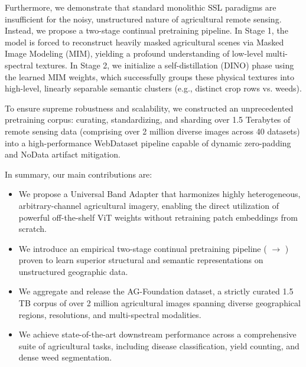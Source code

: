 Furthermore, we demonstrate that standard monolithic SSL paradigms are insufficient for the noisy, unstructured nature of agricultural remote sensing. Instead, we propose a two-stage continual pretraining pipeline. In Stage 1, the model is forced to reconstruct heavily masked agricultural scenes via Masked Image Modeling (MIM), yielding a profound understanding of low-level multi-spectral textures. In Stage 2, we initialize a self-distillation (DINO) phase using the learned MIM weights, which successfully groups these physical textures into high-level, linearly separable semantic clusters (e.g., distinct crop rows vs. weeds). 

To ensure supreme robustness and scalability, we constructed an unprecedented pretraining corpus: curating, standardizing, and sharding over 1.5 Terabytes of remote sensing data (comprising over 2 million diverse images across 40 datasets) into a high-performance WebDataset pipeline capable of dynamic zero-padding and NoData artifact mitigation. 

In summary, our main contributions are:
\begin{itemize}
    \item We propose a Universal Band Adapter that harmonizes highly heterogeneous, arbitrary-channel agricultural imagery, enabling the direct utilization of powerful off-the-shelf ViT weights without retraining patch embeddings from scratch.
    \item We introduce an empirical two-stage continual pretraining pipeline ( $\rightarrow$ ) proven to learn superior structural and semantic representations on unstructured geographic data.
    \item We aggregate and release the AG-Foundation dataset, a strictly curated 1.5 TB corpus of over 2 million agricultural images spanning diverse geographical regions, resolutions, and multi-spectral modalities.
    \item We achieve state-of-the-art downstream performance across a comprehensive suite of agricultural tasks, including disease classification, yield counting, and dense weed segmentation.
\end{itemize}
